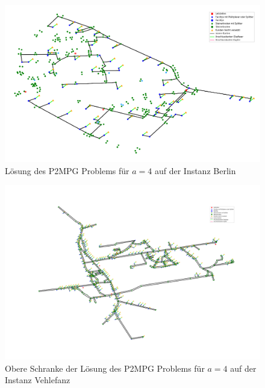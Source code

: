 \documentclass[11pt,a4paper]{article}
\theoremstyle{my_th_style1}
\begin{document}
\begin{figure}[!htbp]
	\begin{center}
		\begin{minipage}{15.0cm}
			\includegraphics[width=1\textwidth]{./Bilder/P2MPG_Berlin_demand1_duration0}
			\caption{Lösung des P2MPG Problems f\"ur \(a=4\) auf der Instanz Berlin}
			\label{p2mpg_b_pic}
		\end{minipage}
	\end{center}
\end{figure}

\begin{figure}[!htbp]
	\begin{center}
		\begin{minipage}{15.0cm}
			\includegraphics[width=1\textwidth]{./Bilder/P2MPG_Vehlefanz_demand1_duration0_upperbound}
			\caption{Obere Schranke der L\"osung des P2MPG Problems f\"ur \(a=4\) auf der Instanz Vehlefanz}
			\label{p2mpg_v_pic_ub}
		\end{minipage}
	\end{center}
\end{figure}
\end{document}
